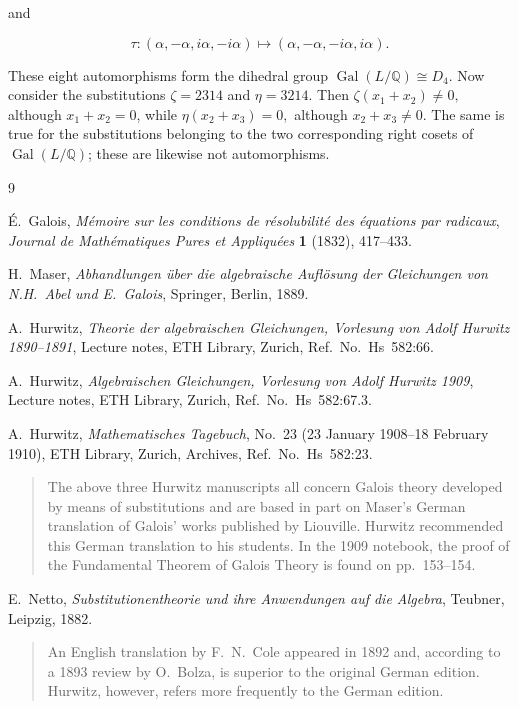 \documentclass[a4paper,11pt]{article}
\begin{document}
 and
 
 \[
 \tau:
 (\alpha,-\alpha,i\alpha,-i\alpha)
 \longmapsto
 (\alpha,-\alpha,-i\alpha,i\alpha).
 \]
 
 These eight automorphisms form the dihedral group
  \(
 \operatorname{Gal}(L/\mathbb{Q})
 \cong
 D_4.
 \)
  Now consider the substitutions
 \(\zeta=2314\) and
 \(\eta=3214\).
 Then
  \(
 \zeta(x_1+x_2)\neq0,
 \)
  although \(x_1+x_2=0\), while
  \(
 \eta(x_2+x_3)=0,
 \)
  although \(x_2+x_3\neq0\).
  The same is true for the substitutions belonging to the two corresponding right cosets of
 \(\operatorname{Gal}(L/\mathbb{Q})\); these are likewise not automorphisms.

\begin{thebibliography}{9}
	
	É.~Galois,
	\textit{Mémoire sur les conditions de résolubilité des équations par radicaux},
	\textit{Journal de Mathématiques Pures et Appliquées}
	\textbf{1} (1832), 417--433.
	
	H.~Maser,
	\textit{Abhandlungen über die algebraische Auflösung der Gleichungen von N.H.~Abel und E.~Galois},
	Springer, Berlin, 1889.
	
	A.~Hurwitz,
	\textit{Theorie der algebraischen Gleichungen, Vorlesung von Adolf Hurwitz 1890--1891},
	Lecture notes, ETH Library, Zurich, Ref.~No.~Hs~582:66.
	
	A.~Hurwitz,
	\textit{Algebraischen Gleichungen, Vorlesung von Adolf Hurwitz 1909},
	Lecture notes, ETH Library, Zurich, Ref.~No.~Hs~582:67.3.
	
	A.~Hurwitz,
	\textit{Mathematisches Tagebuch}, No.~23 (23 January 1908--18 February 1910),
	ETH Library, Zurich, Archives, Ref.~No.~Hs~582:23.
	
	\begin{quote}
		The above three Hurwitz manuscripts all concern Galois theory developed by means of substitutions and are based in part on Maser's German translation of Galois' works published by Liouville. Hurwitz recommended this German translation to his students. In the 1909 notebook, the proof of the Fundamental Theorem of Galois Theory is found on pp.~153--154.
	\end{quote}
	
	E.~Netto,
	\textit{Substitutionentheorie und ihre Anwendungen auf die Algebra},
	Teubner, Leipzig, 1882.
	
	\begin{quote}
		An English translation by F.~N.~Cole appeared in 1892 and, according to a 1893 review by O.~Bolza, is superior to the original German edition. Hurwitz, however, refers more frequently to the German edition.
	\end{quote}
	

\end{thebibliography}
\end{document}
